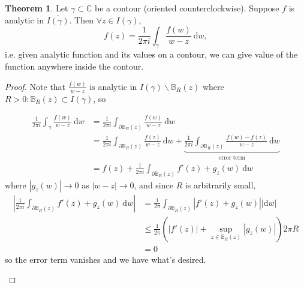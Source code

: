 \documentclass[a4paper]{article}
\theoremstyle{definition}
\newtheorem{thm}[defn]{Theorem}
\begin{document}
\begin{thm}
\label{thm:cauchyintform}
Let $\gamma \subset \mathbb C$ be a contour (oriented counterclockwise). Suppose $f$ is analytic in $\overline{I(\gamma)}$. Then $\forall z\in I(\gamma)$,
\[
f(z) = \frac{1}{2\pi i} \int_\gamma \frac{f(w)}{w-z} \ \mathrm d w,
\]
i.e. given analytic function and its values on a contour, we can give value of the function anywhere inside the contour.
\end{thm}
\begin{proof}
Note that $\displaystyle \frac{f(w)}{w-z}$ is analytic in $I(\gamma)\backslash \mathbb B_R(z)$ where $R>0:\mathbb B_R(z) \subset I(\gamma)$, so

\[
\begin{aligned}
\frac{1}{2\pi i} \int_\gamma \frac{f(w)}{w-z} \ \mathrm d w&=\frac{1}{2\pi i} \int_{\partial \mathbb B_R(z)} \frac{f(w)}{w-z} \ \mathrm d w \\ &= \frac{1}{2\pi i} \int_{\partial \mathbb B_R(z)} \frac{f(z)}{w-z} \ \mathrm d w+\underbrace{\frac{1}{2\pi i} \int_{\partial \mathbb B_R(z)} \frac{f(w)-f(z)}{w-z} \ \mathrm d w}_{\text{error term}} \\&= f(z)+\frac{1}{2\pi i} \int_{\partial \mathbb B_R(z)} f'(z) +g_z(w) \ \mathrm d w
\end{aligned}
\]
where $|g_z(w)| \rightarrow 0$ as $|w-z|\rightarrow 0$, and since $R$ is arbitrarily small, 
\[
\begin{aligned}
\left|\frac{1}{2\pi i} \int_{\partial \mathbb B_R(z)} f'(z) +g_z(w) \ \mathrm d w\right| &= \frac{1}{2\pi} \int_{\partial \mathbb B_R(z)} |f'(z) + g_z(w) | |\mathrm d w| \\ &\leq \frac{1}{2\pi} \left( |f'(z)|+\underset{z\in \mathbb B_R(z)}{\sup} |g_z(w)| \right) 2\pi R \\&=0
\end{aligned}
\]
so the error term vanishes and we have what's desired.
\begin{center}
\end{center}
\end{proof}
\end{document}
